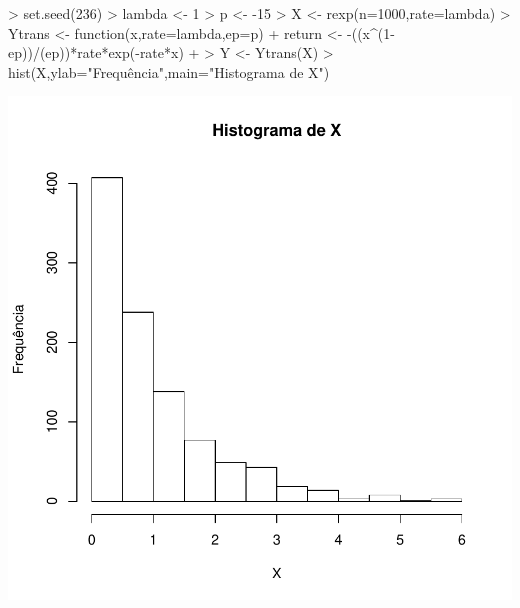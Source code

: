\documentclass{article}
\begin{document}
\begin{enumerate}
\begin{Schunk}
\begin{Sinput}
> set.seed(236)
> lambda <- 1
> p <- -15
> X <- rexp(n=1000,rate=lambda)
> Ytrans <- function(x,rate=lambda,ep=p){
+   return <- -((x^(1-ep))/(ep))*rate*exp(-rate*x)
+ }
> Y <- Ytrans(X)
> hist(X,ylab="Frequência",main="Histograma de X")
\end{Sinput}
\end{Schunk}
\includegraphics{transformacao-010}


\end{enumerate}
\end{document}
